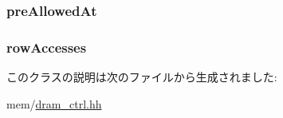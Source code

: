 \label{classDRAMCtrl_1_1Bank_a1c7dd95b87279d92d9a9bbcfed850ddf}
\hypertarget{classDRAMCtrl_1_1Bank_a6b5a4430002d443a4554dbe50d754a4b}{
\subsubsection[{preAllowedAt}]{ {\bf preAllowedAt}}}
\label{classDRAMCtrl_1_1Bank_a6b5a4430002d443a4554dbe50d754a4b}
\hypertarget{classDRAMCtrl_1_1Bank_a92cca9826301cce285e011714476dbbb}{
\subsubsection[{rowAccesses}]{ {\bf rowAccesses}}}
\label{classDRAMCtrl_1_1Bank_a92cca9826301cce285e011714476dbbb}


このクラスの説明は次のファイルから生成されました:\begin{DoxyCompactItemize}
\item 
mem/\hyperlink{dram__ctrl_8hh}{dram\_\-ctrl.hh}\end{DoxyCompactItemize}
